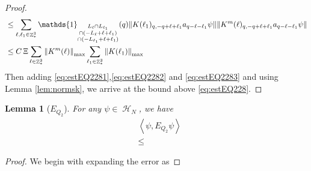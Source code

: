 \documentclass[sn-mathphys, Numbered ,a4paper]{sn-jnl}%
\DeclareMathOperator{\Z}{\mathbb{Z}}
\DeclareMathOperator{\HH}{\mathcal{H}}
\newcommand{\eva}[1]{\left\langle #1 \right\rangle}
\theoremstyle{plain}
\newtheorem{lemma}[theorem]{Lemma}
\theoremstyle{definition}
\newtheorem{example}[theorem]{Example}
\theoremstyle{remark}
\theoremstyle{plain}
\theoremstyle{definition}
\theoremstyle{remark}
\begin{document}
{\begin{proof}
\begin{align}
	&\leq \sum\limits_{\ell, \ell_1\in \Z^3_*} \mathds{1}_{\substack{L_{\ell}\cap L_{\ell_1}\\\cap (-L_{\ell}+\ell+\ell_1) \\ \cap (-L_{\ell_1}+\ell+\ell_1)}} (q) \norm{K(\ell_1)_{q,-q+\ell+\ell_1} a_{q-\ell-\ell_1} \psi}\norm{ K^m(\ell)_{q,-q+\ell+\ell_1} a_{q-\ell-\ell_1}\psi }\nonumber\\
	&\leq C\,\Xi \sum\limits_{\ell \in \Z^3_*} \norm{K^m(\ell)}_{\mathrm{max}} \sum\limits_{\ell_1 \in \Z^3_*} \norm{K(\ell_1)}_{\mathrm{max}} \label{eq:estEQ2283}
\end{align} 
Then adding \eqref{eq:estEQ2281},\eqref{eq:estEQ2282} and \eqref{eq:estEQ2283} and using Lemma \ref{lem:normsk}, we arrive at the bound above \eqref{eq:estEQ228}.  
\end{proof}}

\begin{lemma}[$E_{Q_2}$]
    For any $\psi \in \HH_N$, we have
    \begin{align}
     &\eva{\psi,E_{Q_2}\psi }\nonumber\\ 
     &\leq 
    \end{align}
\end{lemma}
\begin{proof}
    We begin with expanding the error as
    
\end{proof}









\end{document}
